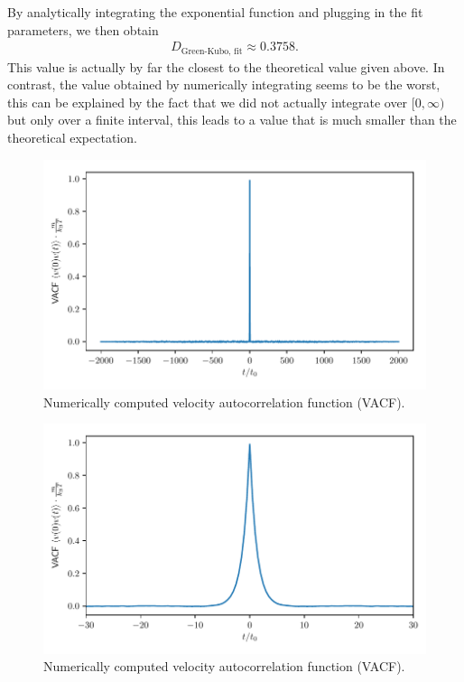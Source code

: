 \documentclass[a4paper,10pt,bibtotoc]{scrartcl}
\begin{document}
By analytically integrating the exponential function and plugging in the fit parameters, we then obtain
\begin{align}
D_\text{Green-Kubo, fit} \approx 0.3758.
\end{align}
This value is actually by far the closest to the theoretical value given above. 
In contrast, the value obtained by numerically integrating seems to be the worst, this can be explained by the fact that we did not actually integrate over $[0,\infty)$ but only over a finite interval, this leads to a value that is much smaller than the theoretical expectation.
\begin{figure}[H]
	\centering
	\includegraphics[width=\linewidth]{vacf.pdf}
	\caption{Numerically computed velocity autocorrelation function (VACF).}
	\label{fig:fig8}
\end{figure}

\begin{figure}[H]
	\centering
	\includegraphics[width=\linewidth]{vacf_zoom.pdf}
	\caption{Numerically computed velocity autocorrelation function (VACF).}
	\label{fig:fig9}
\end{figure}
\end{document}
